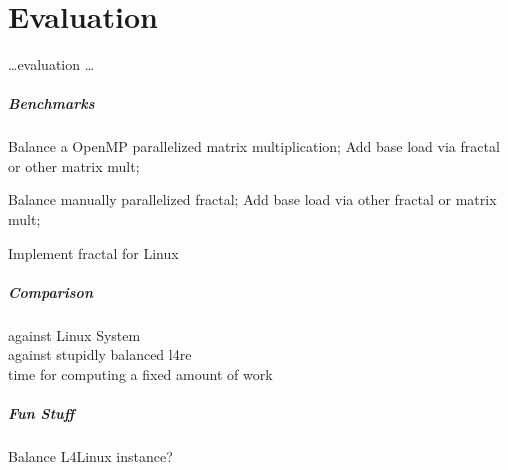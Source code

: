 \chapter{Evaluation}
\label{sec:evaluation}


\ldots evaluation \ldots


\paragraph{Benchmarks}
Balance a OpenMP parallelized matrix multiplication;
Add base load via fractal or other matrix mult;

Balance manually parallelized fractal;
Add base load via other fractal or matrix mult;

Implement fractal for Linux

\paragraph{Comparison} 
  against Linux System \\
  against stupidly balanced l4re \\
  time for computing a fixed amount of work \\

\paragraph{Fun Stuff}
Balance L4Linux instance?

\cleardoublepage


